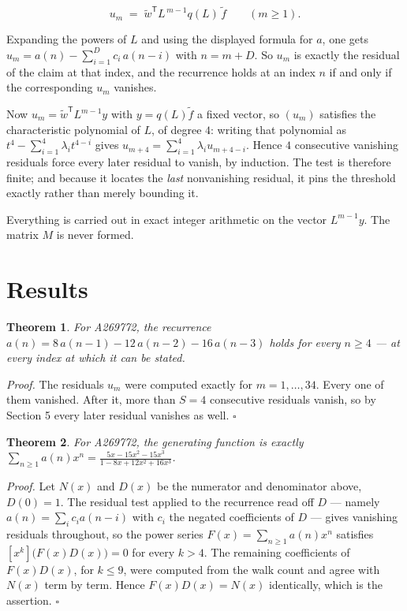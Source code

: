 \documentclass[11pt]{article}
\newtheorem{theorem}{Theorem}
\theoremstyle{definition}
\begin{document}
\[u_m \;=\; \tilde w^{\mathsf T} L^{\,m-1} q(L)\,\tilde f \qquad (m \ge 1).\]

Expanding the powers of $L$ and using the displayed formula for $a$, one gets $u_m = a(n) - \sum_{i=1}^{D} c_i\,a(n-i)$ with $n = m + D$. So $u_m$ is exactly the residual of the claim at that index, and the recurrence holds at an index $n$ if and only if the corresponding $u_m$ vanishes.

Now $u_m = \tilde w^{\mathsf T} L^{m-1} y$ with $y = q(L)\tilde f$ a fixed vector, so $(u_m)$ satisfies the characteristic polynomial of $L$, of degree $4$: writing that polynomial as $t^{4} - \sum_{i=1}^{4} \lambda_i t^{4-i}$ gives $u_{m+4} = \sum_{i=1}^{4} \lambda_i u_{m+4-i}$. Hence $4$ consecutive vanishing residuals force every later residual to vanish, by induction. The test is therefore finite; and because it locates the {\itshape last} nonvanishing residual, it pins the threshold exactly rather than merely bounding it.

Everything is carried out in exact integer arithmetic on the vector $L^{m-1}y$. The matrix $M$ is never formed.

\section{Results}

\begin{theorem} For A269772, the recurrence $a(n) = 8\,a(n-1) - 12\,a(n-2) - 16\,a(n-3)$ holds for every $n \ge 4$ --- at every index at which it can be stated.\end{theorem}

{\itshape Proof.} The residuals $u_m$ were computed exactly for $m = 1,\dots,34$. Every one of them vanished. After it, more than $S = 4$ consecutive residuals vanish, so by Section 5 every later residual vanishes as well. $\square$

\begin{theorem} For A269772, the generating function is exactly $\sum_{n\ge 1} a(n)x^n = \frac{5x - 15x^{2} - 15x^{3}}{1 - 8x + 12x^{2} + 16x^{3}}$.\end{theorem}

{\itshape Proof.} Let $N(x)$ and $D(x)$ be the numerator and denominator above, $D(0)=1$. The residual test applied to the recurrence read off $D$ --- namely $a(n) = \sum_i c_i a(n-i)$ with $c_i$ the negated coefficients of $D$ --- gives vanishing residuals throughout, so the power series $F(x)=\sum_{n\ge 1}a(n)x^n$ satisfies $[x^k]\bigl(F(x)D(x)\bigr) = 0$ for every $k > 4$. The remaining coefficients of $F(x)D(x)$, for $k \le 9$, were computed from the walk count and agree with $N(x)$ term by term. Hence $F(x)D(x) = N(x)$ identically, which is the assertion. $\square$
\end{document}
